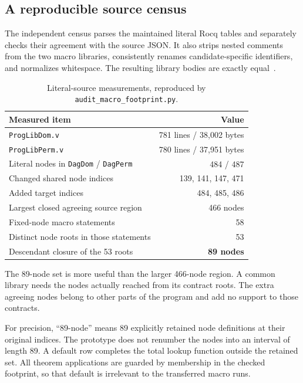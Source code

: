 \documentclass[11pt,letterpaper]{article}
\theoremstyle{definition}\newtheorem{definition}[theorem]{Definition}
\theoremstyle{remark}\newtheorem{remark}[theorem]{Remark}
\newcommand{\code}[1]{\texttt{\small #1}}
\begin{document}
\subsection{A reproducible source census}

The independent census parses the maintained literal Rocq tables and separately checks their agreement with the source JSON. It also strips nested comments from the two macro libraries, consistently renames candidate-specific identifiers, and normalizes whitespace. The resulting library bodies are exactly equal~\cite{macro}.

\begin{table}[ht]
\centering
\begin{tabular}{@{}lr@{}}
\toprule
Measured item & Value\\
\midrule
\code{ProgLibDom.v} & 781 lines / 38,002 bytes\\
\code{ProgLibPerm.v} & 780 lines / 37,951 bytes\\
Literal nodes in \code{DagDom} / \code{DagPerm} & 484 / 487\\
Changed shared node indices & 139, 141, 147, 471\\
Added target indices & 484, 485, 486\\
Largest closed agreeing source region & 466 nodes\\
Fixed-node macro statements & 58\\
Distinct node roots in those statements & 53\\
Descendant closure of the 53 roots & \textbf{89 nodes}\\
\bottomrule
\end{tabular}
\caption{Literal-source measurements, reproduced by \code{audit\_macro\_footprint.py}.}
\end{table}

The 89-node set is more useful than the larger 466-node region. A common library needs the nodes actually reached from its contract roots. The extra agreeing nodes belong to other parts of the program and add no support to those contracts.

For precision, ``89-node'' means 89 explicitly retained node definitions at their original indices. The prototype does not renumber the nodes into an interval of length 89. A default row completes the total lookup function outside the retained set. All theorem applications are guarded by membership in the checked footprint, so that default is irrelevant to the transferred macro runs.
\end{document}
